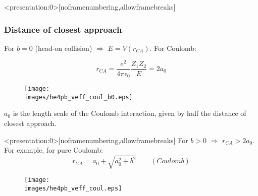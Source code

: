 \documentclass[english,10pt]{beamer}
\newcommand{\images}{images}
\begin{document}
\begin{frame}<presentation:0>[noframenumbering,allowframebreaks]
\frametitle{Distance of closest approach}



 For $b=0$ (head-on collision) $\Rightarrow$  $E= V(r_{CA})$. For Coulomb:

$$ r_{CA}= \frac{e^2}{4\pi \epsilon_0}\frac{Z_1 Z_2}{E} = 2 a_0  $$ 


\begin{figure}{\par \resizebox*{0.4\textwidth}{!}
{\texttt{[image: \\images/he4pb\_veff\_coul\_b0.eps]}} \par}
\end{figure}


 $a_0$ is the length scale of the Coulomb interaction, given by half the distance of closest approach. 

\end{frame}


\begin{frame}<presentation:0>[noframenumbering,allowframebreaks]
 For $b> 0$ $ \Rightarrow$ $r_{CA}> 2 a_0$. For example, for pure Coulomb:
$$
r_{CA}= a_0 + \sqrt{a_0^2 + b^2}  \quad \quad (Coulomb )
$$ 
\begin{figure}{\par \resizebox*{0.55\textwidth}{!}
{\texttt{[image: \\images/he4pb\_veff\_coul.eps]}} \par}
\end{figure}
\end{frame}
\end{document}
